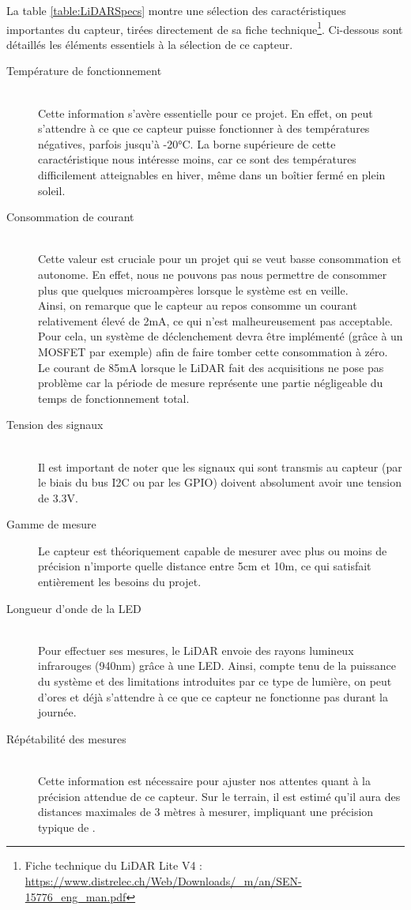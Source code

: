 La table \ref{table:LiDARSpecs} montre une sélection des caractéristiques importantes du capteur, tirées
directement de sa fiche technique\footnote{Fiche technique du LiDAR Lite V4 :
\url{https://www.distrelec.ch/Web/Downloads/_m/an/SEN-15776_eng_man.pdf}}.
Ci-dessous sont détaillés les éléments essentiels à la sélection de ce capteur.

\begin{description}
    \item[Température de fonctionnement] \hfill \\ 
    Cette information s'avère essentielle pour ce projet. En
    effet, on peut s'attendre à ce que ce capteur puisse fonctionner à des températures négatives,
    parfois jusqu'à -20°C. La borne supérieure de cette caractéristique nous intéresse moins, car
    ce sont des températures difficilement atteignables en hiver, même dans un boîtier fermé en 
    plein soleil.
    \item[Consommation de courant] \hfill \\ 
    Cette valeur est cruciale pour un projet qui se veut basse
    consommation et autonome. En effet, nous ne pouvons pas nous permettre de consommer plus que
    quelques microampères lorsque le système est en veille.\\
    Ainsi, on remarque que le capteur au repos consomme un courant relativement élevé de 2mA, ce
    qui n'est malheureusement pas acceptable. Pour cela, un système de déclenchement devra être
    implémenté (grâce à un MOSFET par exemple) afin de faire tomber cette consommation à zéro.\\
    Le courant de 85mA lorsque le LiDAR fait des acquisitions ne pose pas problème car la période 
    de mesure représente une partie négligeable du temps de fonctionnement total.
    \item[Tension des signaux] \hfill \\ 
    Il est important de noter que les signaux qui sont transmis au
    capteur (par le biais du bus I2C ou par les GPIO) doivent absolument avoir une tension de 3.3V.
    \item[Gamme de mesure] Le capteur est théoriquement capable de mesurer avec plus ou moins de
    précision n'importe quelle distance entre 5cm et 10m, ce qui satisfait entièrement les besoins
    du projet.
    \item[Longueur d'onde de la LED] \hfill \\ 
    Pour effectuer ses mesures, le LiDAR envoie des rayons lumineux
    infrarouges (940nm) grâce à une LED. Ainsi, compte tenu de la puissance du système et des limitations
    introduites par ce type de lumière, on peut d'ores et déjà s'attendre à ce que ce capteur ne
    fonctionne pas durant la journée.
    \item[Répétabilité des mesures] \hfill \\ 
    Cette information est nécessaire pour ajuster nos attentes quant
    à la précision attendue de ce capteur. Sur le terrain, il est estimé qu'il aura des distances 
    maximales de 3 mètres à mesurer, impliquant une précision typique de \textpm 2cm. 
\end{description}

